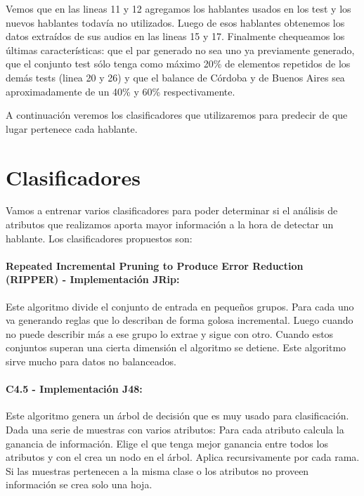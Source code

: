 Vemos que en las lineas 11 y 12 agregamos los hablantes usados en los test y los nuevos hablantes todavía no utilizados. Luego de esos hablantes obtenemos los datos extraídos de sus audios en las lineas 15 y 17. Finalmente chequeamos los últimas características: que el par generado no sea uno ya previamente generado, que el conjunto test sólo tenga como máximo 20\% de elementos repetidos de los demás tests (linea 20 y 26) y que el balance de Córdoba y de Buenos Aires sea aproximadamente de un 40\% y 60\% respectivamente.

A continuación veremos los clasificadores que utilizaremos para predecir de que lugar pertenece cada hablante.

\section{Clasificadores}

Vamos a entrenar varios clasificadores para poder determinar si el análisis de atributos que realizamos aporta mayor información a la hora de detectar un hablante. Los clasificadores propuestos son: 

\paragraph{Repeated Incremental Pruning to Produce Error Reduction (RIPPER) \cite{Cohen1995} - Implementación JRip:}


Este algoritmo divide el conjunto de entrada en pequeños grupos. Para cada uno va generando reglas que lo describan de forma golosa incremental. Luego cuando no puede describir más a ese grupo lo extrae y sigue con otro. Cuando estos conjuntos superan una cierta dimensión el algoritmo se detiene. Este algoritmo sirve mucho para datos no balanceados.

\paragraph{C4.5 \cite{Quinlan1993} - Implementación J48:}


Este algoritmo genera un árbol de decisión que es muy usado para clasificación. Dada una serie de muestras con varios atributos: Para cada atributo calcula la ganancia de información. Elige el que tenga mejor ganancia entre todos los atributos y con el crea un nodo en el árbol. Aplica recursivamente por cada rama. Si las muestras pertenecen a la misma clase o los atributos no proveen información se crea solo una hoja.

